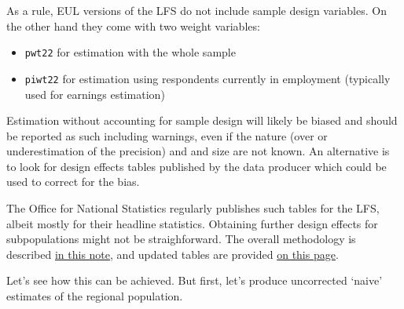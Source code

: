 \documentclass[
  14,
  a4paper,
  DIV=11,
  numbers=noendperiod]{scrartcl}
\newenvironment{Shaded}{\begin{snugshade}}{\end{snugshade}}
\newcommand{\AttributeTok}[1]{\textcolor[rgb]{0.40,0.45,0.13}{#1}}
\newcommand{\DecValTok}[1]{\textcolor[rgb]{0.68,0.00,0.00}{#1}}
\newcommand{\FunctionTok}[1]{\textcolor[rgb]{0.28,0.35,0.67}{#1}}
\newcommand{\NormalTok}[1]{\textcolor[rgb]{0.00,0.23,0.31}{#1}}
\newcommand{\OtherTok}[1]{\textcolor[rgb]{0.00,0.23,0.31}{#1}}
\newcommand{\SpecialCharTok}[1]{\textcolor[rgb]{0.37,0.37,0.37}{#1}}
\newcommand{\StringTok}[1]{\textcolor[rgb]{0.13,0.47,0.30}{#1}}
\providecommand{\tightlist}{%
  \setlength{\itemsep}{0pt}\setlength{\parskip}{0pt}}\usepackage{longtable,booktabs,array}
\begin{document}
As a rule, EUL versions of the LFS do not include sample design
variables. On the other hand they come with two weight variables:

\begin{itemize}
\tightlist
\item
  \texttt{pwt22} for estimation with the whole sample
\item
  \texttt{piwt22} for estimation using respondents currently in
  employment (typically used for earnings estimation)
\end{itemize}

Estimation without accounting for sample design will likely be biased
and should be reported as such including warnings, even if the nature
(over or underestimation of the precision) and and size are not known.
An alternative is to look for design effects tables published by the
data producer which could be used to correct for the bias.

The Office for National Statistics regularly publishes such tables for
the LFS, albeit mostly for their headline statistics. Obtaining further
design effects for subpopulations might not be straighforward. The
overall methodology is described
\href{https://www.ons.gov.uk/methodology/methodologicalpublications/generalmethodology/onsworkingpaperseries/onsmethodologyworkingpaperseriesno9guidetocalculatingstandarderrorsforonssocialsurveys\#annex-a-labour-force-survey-standard-errors-january-to-march-2015-united-kingdom}{in
this note}, and updated tables are provided
\href{Volume\%201:\%20Background\%20and\%20methodology\%20(PDF,\%201.2MB)}{on
this page}.

Let's see how this can be achieved. But first, let's produce uncorrected
`naive' estimates of the regional population.

\begin{Shaded}
\end{Shaded}
\end{document}
